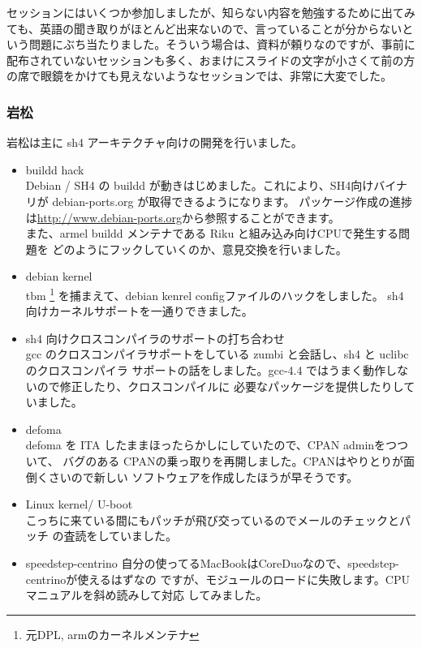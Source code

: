 \documentclass[mingoth,a4paper]{jsarticle}
\begin{document}
セッションにはいくつか参加しましたが、知らない内容を勉強するために出てみ
ても、英語の聞き取りがほとんど出来ないので、言っていることが分からないと
いう問題にぶち当たりました。そういう場合は、資料が頼りなのですが、事前に
配布されていないセッションも多く、おまけにスライドの文字が小さくて前の方
の席で眼鏡をかけても見えないようなセッションでは、非常に大変でした。

\subsubsection{岩松}
岩松は主に sh4 アーキテクチャ向けの開発を行いました。
\begin{itemize}
\item buildd hack\\
Debian / SH4 の buildd が動きはじめました。これにより、SH4向けバイナリが debian-ports.org
が取得できるようになります。
パッケージ作成の進捗は\url{http://www.debian-ports.org}から参照することができます。
\\
また、armel buildd メンテナである Riku と組み込み向けCPUで発生する問題を
どのようにフックしていくのか、意見交換を行いました。
\item debian kernel\\
tbm \footnote{元DPL, armのカーネルメンテナ} を捕まえて、debian kenrel configファイルのハックをしました。
sh4 向けカーネルサポートを一通りできました。

\item sh4 向けクロスコンパイラのサポートの打ち合わせ\\
gcc のクロスコンパイラサポートをしている zumbi と会話し、sh4 と uclibcのクロスコンパイラ
サポートの話をしました。gcc-4.4 ではうまく動作しないので修正したり、クロスコンパイルに
必要なパッケージを提供したりしていました。

\item defoma\\
defoma を ITA したままほったらかしにしていたので、CPAN adminをつついて、
バグのある CPANの乗っ取りを再開しました。CPANはやりとりが面倒くさいので新しい
ソフトウェアを作成したほうが早そうです。

\item Linux kernel/ U-boot \\ 
こっちに来ている間にもパッチが飛び交っているのでメールのチェックとパッチ
の査読をしていました。

\item speedstep-centrino
自分の使ってるMacBookはCoreDuoなので、speedstep-centrinoが使えるはずなの
ですが、モジュールのロードに失敗します。CPUマニュアルを斜め読みして対応
してみました。

\end{itemize}
\end{document}
